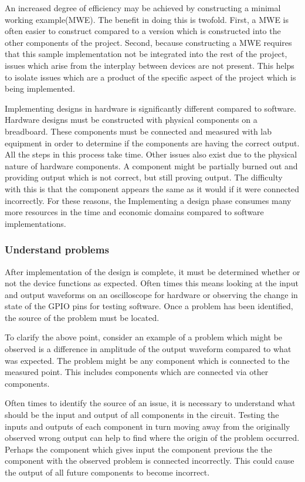 \documentclass{article}	%
\begin{document}
\begin{multicols}{2}
An increased degree of efficiency may be achieved by
constructing a minimal working example(MWE).
The benefit in doing this is twofold.
First, a MWE is often easier to construct compared to
a version which is constructed into the other
components of the project.
Second, because constructing a MWE requires that
this sample implementation not be integrated into
the rest of the project,
issues which arise from the interplay between devices are not present.
This helps to isolate issues which are a product
of the specific aspect of the project which is being implemented.

Implementing designs in hardware is significantly different compared to software.
Hardware designs must be constructed with physical components on a breadboard.
These components must be connected and measured with lab equipment
in order to determine if the components are having the correct output.
All the steps in this process take time.
Other issues also exist due to the physical nature of 
hardware components.
A component might be partially burned out and providing output
which is not correct, but still proving output.
The difficulty with this is that the component appears
the same as it would if it were connected incorrectly.
For these reasons,
the Implementing a design phase 
consumes many more resources in the time and economic
domains compared to software implementations.

\subsubsection{Understand problems}
After implementation of the design is complete,
it must be determined whether or not the device functions
as expected.
Often times this means looking at the input and
output waveforms on an oscilloscope for hardware or
observing the change in state of the GPIO pins for
testing software.
Once a problem has been identified,
the source of the problem must be located.

To clarify the above point, consider 
an example of a problem which might be observed is
a difference in amplitude of the output waveform
compared to what was expected.
The problem might be any component which is
connected to the measured point.
This includes components which are connected
via other components.

Often times to identify the source of an issue,
it is necessary to understand what should be
the input and output of all components in the circuit.
Testing the inputs and outputs of each component in turn
moving away from the originally observed wrong output can
help to find where the origin of the problem occurred.
Perhaps the component which gives input the component
previous the the component with the observed problem
is connected incorrectly.
This could cause the output of all future components to become incorrect.


\end{multicols}
\end{document}
